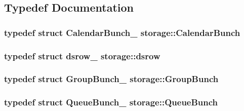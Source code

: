 \subsection{Typedef Documentation}
\hypertarget{namespacestorage_a47a941864de57d132a90257532a3f5a4}{
\subsubsection[{CalendarBunch}]{\setlength{\rightskip}{0pt plus 5cm}typedef struct {\bf CalendarBunch\_\-} {\bf storage::CalendarBunch}}}
\label{d0/daa/namespacestorage_a47a941864de57d132a90257532a3f5a4}
\hypertarget{namespacestorage_a84e19b67e9af2b43bf856350014b7ae2}{
\subsubsection[{dsrow}]{\setlength{\rightskip}{0pt plus 5cm}typedef struct {\bf dsrow\_\-} {\bf storage::dsrow}}}
\label{d0/daa/namespacestorage_a84e19b67e9af2b43bf856350014b7ae2}
\hypertarget{namespacestorage_a0e84e70cce6b3f424ada280421e39929}{
\subsubsection[{GroupBunch}]{\setlength{\rightskip}{0pt plus 5cm}typedef struct {\bf GroupBunch\_\-} {\bf storage::GroupBunch}}}
\label{d0/daa/namespacestorage_a0e84e70cce6b3f424ada280421e39929}
\hypertarget{namespacestorage_a1434d2eb1851911feb0d96bcebbe67b4}{
\subsubsection[{QueueBunch}]{\setlength{\rightskip}{0pt plus 5cm}typedef struct {\bf QueueBunch\_\-} {\bf storage::QueueBunch}}}
\label{d0/daa/namespacestorage_a1434d2eb1851911feb0d96bcebbe67b4}


